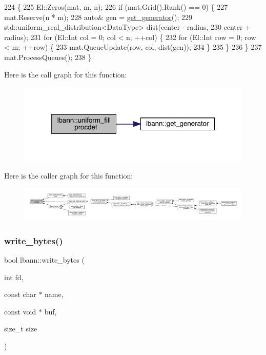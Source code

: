 \begin{DoxyCode}
224                                            \{
225   El::Zeros(mat, m, n);
226   \textcolor{keywordflow}{if} (mat.Grid().Rank() == 0) \{
227     mat.Reserve(n * m);
228     \textcolor{keyword}{auto}& gen = \hyperlink{namespacelbann_a4fea7ba21017b49d1e34394b4c20c764}{get\_generator}();
229     std::uniform\_real\_distribution<DataType> dist(center - radius,
230         center + radius);
231     \textcolor{keywordflow}{for} (El::Int col = 0; col < n; ++col) \{
232       \textcolor{keywordflow}{for} (El::Int row = 0; row < m; ++row) \{
233         mat.QueueUpdate(row, col, dist(gen));
234       \}
235     \}
236   \}
237   mat.ProcessQueues();
238 \}
\end{DoxyCode}
Here is the call graph for this function\+:\nopagebreak
\begin{figure}[H]
\begin{center}
\leavevmode
\includegraphics[width=319pt]{namespacelbann_a93fc1b42be6ab461e803cb48d58c4d81_cgraph}
\end{center}
\end{figure}
Here is the caller graph for this function\+:\nopagebreak
\begin{figure}[H]
\begin{center}
\leavevmode
\includegraphics[width=350pt]{namespacelbann_a93fc1b42be6ab461e803cb48d58c4d81_icgraph}
\end{center}
\end{figure}
\mbox{\label{namespacelbann_aed95061796f19fa1648dcc99dc335abd}} 
\subsubsection{\texorpdfstring{write\+\_\+bytes()}{write\_bytes()}}
{\footnotesize\ttfamily bool lbann\+::write\+\_\+bytes (\begin{DoxyParamCaption}\item[{int}]{fd,  }\item[{const char $\ast$}]{name,  }\item[{const void $\ast$}]{buf,  }\item[{size\+\_\+t}]{size }\end{DoxyParamCaption})}




